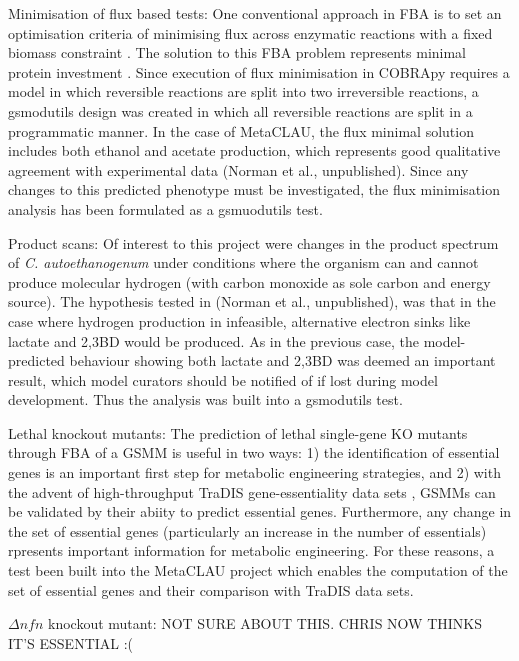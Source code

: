\documentclass[a4paper,10pt]{article}
\begin{document}
Minimisation of flux based tests: One conventional approach in FBA is to set an optimisation criteria of minimising flux across enzymatic reactions with a fixed biomass constraint \cite{holzhutter2006thegeneralised}. The solution to this FBA problem represents minimal protein investment \cite{holzhutter2006thegeneralised}. Since execution of flux minimisation in COBRApy requires a model in which reversible reactions are split into two irreversible reactions, a gsmodutils design was created in which all reversible reactions are split in a programmatic manner. In the case of MetaCLAU, the flux minimal solution includes both ethanol and acetate production, which represents good qualitative agreement with experimental data (Norman et al., unpublished). Since any changes to this predicted phenotype must be investigated, the flux minimisation analysis has been formulated as a gsmuodutils test.

Product scans: Of interest to this project were changes in the product spectrum of \textit{C. autoethanogenum} under conditions where the organism can and cannot produce molecular hydrogen (with carbon monoxide as sole carbon and energy source). The hypothesis tested in (Norman et al., unpublished), was that in the case where hydrogen production in infeasible, alternative electron sinks like lactate and 2,3BD would be produced. As in the previous case, the model-predicted behaviour showing both lactate and 2,3BD was deemed an important result, which model curators should be notified of if lost during model development. Thus the analysis was built into a gsmodutils test.

Lethal knockout mutants: The prediction of lethal single-gene KO mutants through FBA of a GSMM is useful in two ways: 1) the identification of essential genes is an important first step for metabolic engineering strategies, and 2) with the advent of high-throughput TraDIS gene-essentiality data sets \cite{langridge2009simultaneous}, GSMMs can be validated by their abiity to predict essential genes. Furthermore, any change in the set of essential genes (particularly an increase in the number of essentials) rpresents important information for metabolic engineering. For these reasons, a test been built into the MetaCLAU project which enables the computation of the set of essential genes and their comparison with TraDIS data sets.

$\Delta \textit{nfn}$ knockout mutant: NOT SURE ABOUT THIS. CHRIS NOW THINKS IT'S ESSENTIAL :(

 
\end{document}
